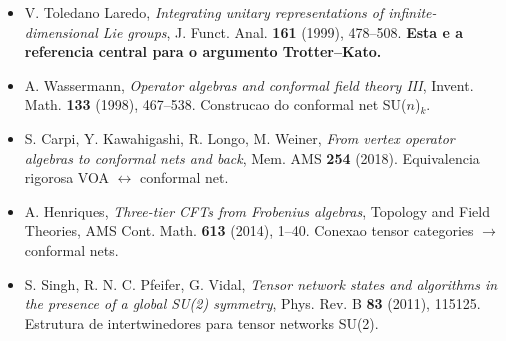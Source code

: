 \begin{itemize}
\item V. Toledano Laredo,
\emph{Integrating unitary representations of infinite-dimensional Lie groups},
J. Funct. Anal. \textbf{161} (1999), 478--508.
\textbf{Esta e a referencia central para o argumento Trotter--Kato.}

\item A. Wassermann,
\emph{Operator algebras and conformal field theory III},
Invent. Math. \textbf{133} (1998), 467--538.
Construcao do conformal net SU($n$)$_k$.

\item S. Carpi, Y. Kawahigashi, R. Longo, M. Weiner,
\emph{From vertex operator algebras to conformal nets and back},
Mem. AMS \textbf{254} (2018).
Equivalencia rigorosa VOA $\leftrightarrow$ conformal net.

\item A. Henriques,
\emph{Three-tier CFTs from Frobenius algebras},
Topology and Field Theories, AMS Cont. Math. \textbf{613} (2014), 1--40.
Conexao tensor categories $\to$ conformal nets.

\item S. Singh, R. N. C. Pfeifer, G. Vidal,
\emph{Tensor network states and algorithms in the presence of a global SU(2) symmetry},
Phys. Rev. B \textbf{83} (2011), 115125.
Estrutura de intertwinedores para tensor networks SU(2).
\end{itemize}
